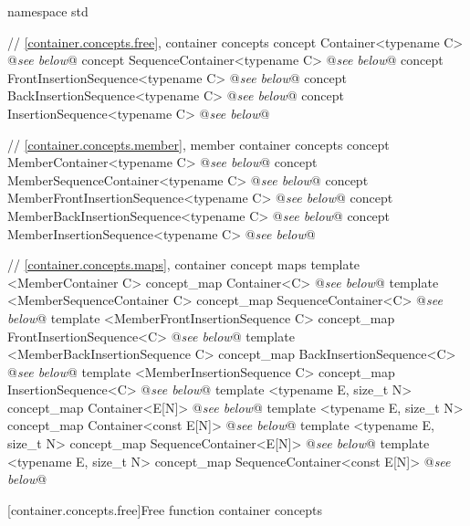 \documentclass[american,twoside]{book}
\begin{document}
\begin{codeblock}
namespace std {
  // \ref{container.concepts.free}, container concepts
  concept Container<typename C> @\textit{see below}@
  concept SequenceContainer<typename C> @\textit{see below}@
  concept FrontInsertionSequence<typename C> @\textit{see below}@
  concept BackInsertionSequence<typename C> @\textit{see below}@
  concept InsertionSequence<typename C> @\textit{see below}@

  // \ref{container.concepts.member}, member container concepts
  concept MemberContainer<typename C> @\textit{see below}@
  concept MemberSequenceContainer<typename C> @\textit{see below}@
  concept MemberFrontInsertionSequence<typename C> @\textit{see below}@
  concept MemberBackInsertionSequence<typename C> @\textit{see below}@
  concept MemberInsertionSequence<typename C> @\textit{see below}@

  // \mbox{\ref{container.concepts.maps}}, container concept maps
  template <MemberContainer C>              concept_map Container<C> @\textit{see below}@
  template <MemberSequenceContainer C>      concept_map SequenceContainer<C> @\textit{see below}@
  template <MemberFrontInsertionSequence C> concept_map FrontInsertionSequence<C> @\textit{see below}@
  template <MemberBackInsertionSequence C>  concept_map BackInsertionSequence<C> @\textit{see below}@
  template <MemberInsertionSequence C>      concept_map InsertionSequence<C> @\textit{see below}@
  template <typename E, size_t N>           concept_map Container<E[N]> @\textit{see below}@
  template <typename E, size_t N>           concept_map Container<const E[N]> @\textit{see below}@
  template <typename E, size_t N>           concept_map SequenceContainer<E[N]> @\textit{see below}@
  template <typename E, size_t N>           concept_map SequenceContainer<const E[N]> @\textit{see below}@
}
\end{codeblock}

[container.concepts.free]{Free function container concepts}

\pnum
{}
\end{document}

